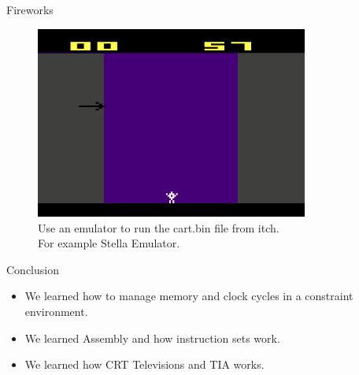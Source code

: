 \documentclass{beamer}
\begin{document}
\begin{frame}{Fireworks}
    \begin{figure}
        \centering
        \includegraphics[width=0.8\textwidth]{gameImage.png} %
        \caption{Use an emulator to run the cart.bin file from itch.\\ For example Stella Emulator.}

    \end{figure}
\end{frame}


\begin{frame}{Conclusion}
        \centering
  \begin{itemize}
    \item We learned how to manage memory and clock cycles in a constraint environment.
    \item We learned Assembly and how instruction sets work.
    \item We learned how CRT Televisions and TIA works.
  \end{itemize}

\end{frame}



\end{document}
